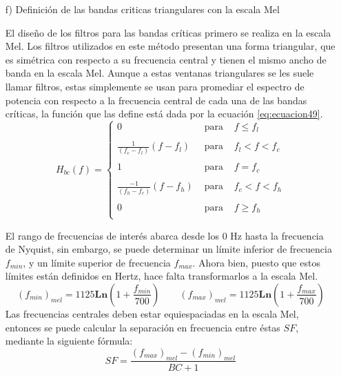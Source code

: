 \begin{enumerate}
\item[f)]Definición de las bandas criticas triangulares con la escala Mel
\par
El diseño de los filtros para las bandas críticas primero se realiza en la escala Mel. Los filtros utilizados en este método presentan una forma triangular, que es simétrica con respecto a su frecuencia central y tienen el mismo ancho de banda en la escala Mel. Aunque a estas ventanas triangulares se les suele llamar filtros, estas simplemente se usan para promediar el espectro de potencia con respecto a la frecuencia central de cada una de las bandas críticas, la función que las define está dada por la ecuación \ref{eq:ecuacion49}.
\begin{equation}
\label{eq:ecuacion49}
H_{bc}(f)= \left\{ \begin{array}{lcl}
0 & \mbox{ para } & f \leq f_{l} \\
& & \\
\frac{1}{(f_{c} - f_{l})}(f - f_{l}) & \mbox{ para } & f_{l} < f < f_{c} \\
& & \\
1 & \mbox{ para } & f = f_{c} \\
& & \\
\frac{- 1}{(f_{h} - f_{c})}(f - f_{h}) & \mbox{ para } & f_{c} < f < f_{h} \\
& & \\
0 & \mbox{ para } & f \geq f_{h} \\
\end{array}
\right.
\end{equation}

El rango de frecuencias de interés abarca desde los 0 Hz hasta la frecuencia de Nyquist, sin embargo, se puede determinar un límite inferior de frecuencia $f_{min}$, y un límite superior de frecuencia $f_{max}$. Ahora bien, puesto que estos límites están definidos en Hertz, hace falta transformarlos a la escala Mel.
\begin{equation}
\label{eq:ecuacion50}
\left ( f_{min} \right )_{mel} = 1125\mathbf{Ln}\left ( 1 + \frac{f_{min}}{700} \right )
\qquad
\left ( f_{max} \right )_{mel} = 1125\mathbf{Ln}\left ( 1 + \frac{f_{max}}{700} \right )
\end{equation}
Las frecuencias centrales deben estar equiespaciadas en la escala Mel, entonces se puede calcular la separación en frecuencia entre éstas $SF$, mediante la siguiente fórmula:
\begin{equation}
\label{eq:ecuacion51}
SF = \frac{\left ( f_{max} \right )_{mel} - \left ( f_{min} \right )_{mel}}{BC + 1}
\end{equation}


\end{enumerate}
